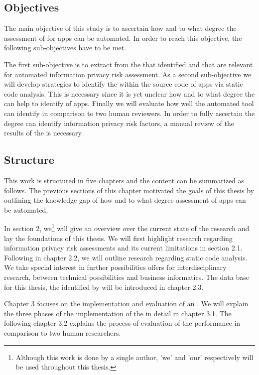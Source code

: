 \subsection{Objectives}

The main objective of this study is to ascertain how and to what degree the assessment of \iprfs for \mH apps can be automated.
In order to reach this objective, the following sub-objectives have to be met.

The first sub-objective is to extract \iprfs from the \ipp that \cite{Dehling2016} identified and that are relevant for automated information privacy risk assessment.
As a second sub-objective we will develop strategies to identify the \iprfs within the source code of \mH apps via static code analysis.
This is necessary since it is yet unclear how and to what degree the \sca can help to identify \iprfs of \mH apps. 
Finally we will evaluate how well the automated \pra tool can identify \iprfs in comparison to two human reviewers.
In order to fully ascertain the degree \sca can identify information privacy risk factors, a manual review of the results of the \sca is necessary.

\subsection{Structure}

This work is structured in five chapters and the content can be summarized as follows. 
The previous sections of this chapter motivated the goals of this thesis by outlining the knowledge gap of how and to what degree \ipr assessment of \mH apps can be automated.

In section 2, we\footnote{Although this work is done by a single author, 'we' and 'our' respectively will be used throughout this thesis.} will give an overview over the current state of the research and lay the foundations of this thesis.
We will first highlight research regarding information privacy risk assessments and its current limitations in section 2.1.
Following in chapter 2.2, we will outline research regarding static code analysis. 
We take special interest in further possibilities \sca offers for interdisciplinary research, between technical possibilities and business informatics.
The data base for this thesis, the \ipp identified by \textcite{Dehling2016} will be introduced in chapter 2.3.

Chapter 3 focuses on the implementation and evaluation of an \aiprat.
We will explain the three phases of the implementation of the \aiprat in detail in chapter 3.1.
The following chapter 3.2 explains the process of evaluation of the \aiprat performance in comparison to two human researchers.

